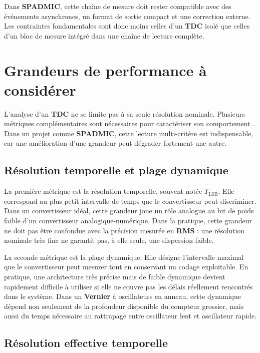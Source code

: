 Dans \textbf{SPADMIC}, cette chaîne de mesure doit rester compatible avec des événements asynchrones, un format de sortie compact et une correction externe. Les contraintes fondamentales sont donc moins celles d'un \textbf{TDC} isolé que celles d'un bloc de mesure intégré dans une chaîne de lecture complète.

\section{Grandeurs de performance à considérer}

L'analyse d'un \textbf{TDC} ne se limite pas à sa seule résolution nominale. Plusieurs métriques complémentaires sont nécessaires pour caractériser son comportement \cite{annagrebah2021thesis}. Dans un projet comme \textbf{SPADMIC}, cette lecture multi-critère est indispensable, car une amélioration d'une grandeur peut dégrader fortement une autre.

\subsection{Résolution temporelle et plage dynamique}

La première métrique est la résolution temporelle, souvent notée $T_{\mathrm{LSB}}$. Elle correspond au plus petit intervalle de temps que le convertisseur peut discriminer. Dans un convertisseur idéal, cette grandeur joue un rôle analogue au bit de poids faible d'un convertisseur analogique-numérique. Dans la pratique, cette grandeur ne doit pas être confondue avec la précision mesurée en \textbf{RMS} : une résolution nominale très fine ne garantit pas, à elle seule, une dispersion faible.

La seconde métrique est la plage dynamique. Elle désigne l'intervalle maximal que le convertisseur peut mesurer tout en conservant un codage exploitable. En pratique, une architecture très précise mais de faible dynamique devient rapidement difficile à utiliser si elle ne couvre pas les délais réellement rencontrés dans le système. Dans un \textbf{Vernier} à oscillateurs en anneau, cette dynamique dépend non seulement de la profondeur disponible du compteur grossier, mais aussi du temps nécessaire au rattrapage entre oscillateur lent et oscillateur rapide.

\subsection{Résolution effective temporelle}

